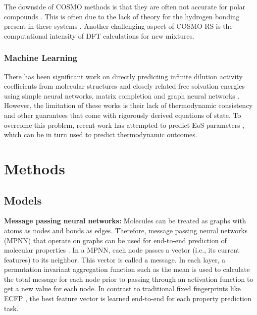 The downside of COSMO methods is that they are often not accurate for polar compounds \cite{Constantinescu2005, Kundu2011}. This is often due to the lack of theory for the hydrogen bonding present in these systems \cite{Kundu2011}. Another challenging aspect of COSMO-RS is the computational intensity of DFT calculations for new mixtures. 

\subsubsection{Machine Learning}

There has been significant work on directly predicting infinite dilution activity coefficients from molecular structures and closely related free solvation energies using simple neural networks\cite{Urata2002, RamirezBeltran2009, Nami2011, Behrooz2017}, matrix completion\cite{Jirasek2020} and  graph neural networks \cite{Vermeire2021, Felton2022, SanchezMedina2022, Qin2022, Rittig2022}. However, the limitation of these works is their lack of thermodynamic consistency and other guarantees that come with rigorously derived equations of state. To overcome this problem, recent work has attempted to predict EoS parameters \cite{Abbasi2020, Madani2021, Abdallahelhadj2022, Winter2022}, which can be in turn used to predict thermodynamic outcomes.
 
\section{Methods}
\subsection{Models}

\noindent
\textbf{Message passing neural networks:} Molecules can be treated as graphs with atoms as nodes and bonds as edges. Therefore, message passing neural networks (MPNN) that operate on graphs can be used for end-to-end prediction of molecular properties \cite{Gilmer2017}.  In a MPNN, each node passes a vector (i.e., its current features) to its neighbor. This  vector is called a message. In each layer, a permutation invariant aggregation function such as the mean is used to calculate the total message for each node prior to passing through an activation function to get a new value for each node.  In contrast to traditional fixed fingerprints like ECFP \cite{Rogers2010}, the best feature vector is learned end-to-end for each property prediction task.

